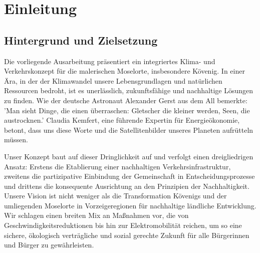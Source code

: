 	\section{Einleitung}
	\subsection{Hintergrund und Zielsetzung}
	Die vorliegende Ausarbeitung präsentiert ein integriertes Klima- und Verkehrskonzept für die malerischen Moselorte, insbesondere Kövenig. In einer Ära, in der der Klimawandel unsere Lebensgrundlagen und natürlichen Ressourcen bedroht, ist es unerlässlich, zukunftsfähige und nachhaltige Lösungen zu finden. Wie der deutsche Astronaut Alexander Gerst aus dem All bemerkte: 'Man sieht Dinge, die einen überraschen: Gletscher die kleiner werden, Seen, die austrocknen.' Claudia Kemfert, eine führende Expertin für Energieökonomie, betont, dass uns diese Worte und die Satellitenbilder unseres Planeten aufrütteln müssen.\cite{kemfert2023schockwellen}
	
	Unser Konzept baut auf dieser Dringlichkeit auf und verfolgt einen dreigliedrigen Ansatz: Erstens die Etablierung einer nachhaltigen Verkehrsinfrastruktur, zweitens die partizipative Einbindung der Gemeinschaft in Entscheidungsprozesse und drittens die konsequente Ausrichtung an den Prinzipien der Nachhaltigkeit. Unsere Vision ist nicht weniger als die Transformation Kövenigs und der umliegenden Moselorte in Vorzeigeregionen für nachhaltige ländliche Entwicklung. Wir schlagen einen breiten Mix an Maßnahmen vor, die von Geschwindigkeitsreduktionen bis hin zur Elektromobilität reichen, um so eine sichere, ökologisch verträgliche und sozial gerechte Zukunft für alle Bürgerinnen und Bürger zu gewährleisten.
